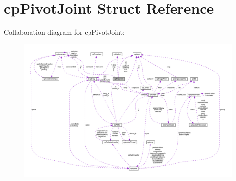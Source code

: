 \hypertarget{structcpPivotJoint}{}\section{cp\+Pivot\+Joint Struct Reference}
\label{structcpPivotJoint}


Collaboration diagram for cp\+Pivot\+Joint\+:
\nopagebreak
\begin{figure}[H]
\begin{center}
\leavevmode
\includegraphics[width=350pt]{structcpPivotJoint__coll__graph}
\end{center}
\end{figure}
